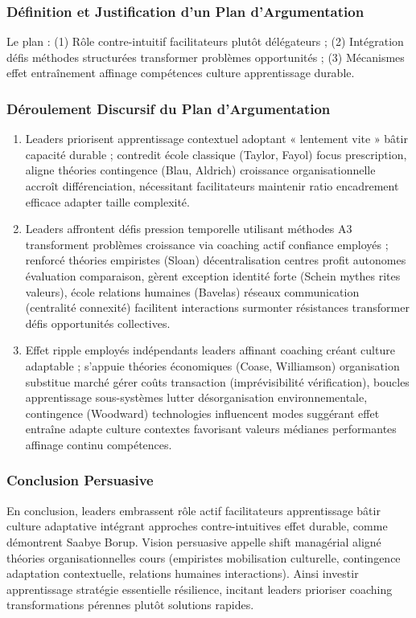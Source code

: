 \documentclass[11pt]{rapportECL}
\begin{document}
\subsubsection{Définition et Justification d’un Plan d’Argumentation}
Le plan : (1) Rôle contre-intuitif facilitateurs plutôt délégateurs ; (2) Intégration défis méthodes structurées transformer problèmes opportunités ; (3) Mécanismes effet entraînement affinage compétences culture apprentissage durable.

\subsubsection{Déroulement Discursif du Plan d’Argumentation}
\begin{enumerate}
\item Leaders priorisent apprentissage contextuel adoptant « lentement vite » bâtir capacité durable ; contredit école classique (Taylor, Fayol) focus prescription, aligne théories contingence (Blau, Aldrich) croissance organisationnelle accroît différenciation, nécessitant facilitateurs maintenir ratio encadrement efficace adapter taille complexité.
\item Leaders affrontent défis pression temporelle utilisant méthodes A3 transforment problèmes croissance via coaching actif confiance employés ; renforcé théories empiristes (Sloan) décentralisation centres profit autonomes évaluation comparaison, gèrent exception identité forte (Schein mythes rites valeurs), école relations humaines (Bavelas) réseaux communication (centralité connexité) facilitent interactions surmonter résistances transformer défis opportunités collectives.
\item Effet ripple employés indépendants leaders affinant coaching créant culture adaptable ; s’appuie théories économiques (Coase, Williamson) organisation substitue marché gérer coûts transaction (imprévisibilité vérification), boucles apprentissage sous-systèmes lutter désorganisation environnementale, contingence (Woodward) technologies influencent modes suggérant effet entraîne adapte culture contextes favorisant valeurs médianes performantes affinage continu compétences.
\end{enumerate}

\subsubsection{Conclusion Persuasive}
En conclusion, leaders embrassent rôle actif facilitateurs apprentissage bâtir culture adaptative intégrant approches contre-intuitives effet durable, comme démontrent Saabye Borup. Vision persuasive appelle shift managérial aligné théories organisationnelles cours (empiristes mobilisation culturelle, contingence adaptation contextuelle, relations humaines interactions). Ainsi investir apprentissage stratégie essentielle résilience, incitant leaders prioriser coaching transformations pérennes plutôt solutions rapides.
\end{document}
